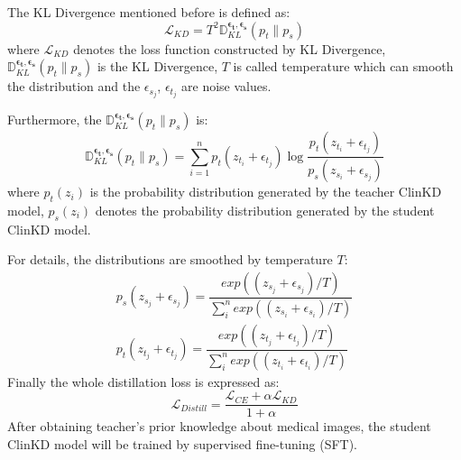The KL Divergence mentioned before is defined as:
\begin{equation}
    \mathcal{L}_{KD} = T^2\mathbb{D}^{\boldsymbol{\epsilon_{t}}, \boldsymbol{\epsilon_{s}}}_{KL}(p_{t} \|p_{s})
\end{equation}
where $\mathcal{L}_{KD}$ denotes the loss function constructed by KL Divergence, $\mathbb{D}^{\boldsymbol{\epsilon_{t}}, \boldsymbol{\epsilon_{s}}}_{KL}(p_{t} \|p_{s})$ is the KL Divergence, $T$ is called temperature which can smooth the distribution and the $\epsilon_{s_j}$, $\epsilon_{t_j}$ are noise values. 

Furthermore, the $\mathbb{D}^{\boldsymbol{\epsilon_{t}}, \boldsymbol{\epsilon_{s}}}_{KL}(p_{t} \|p_{s})$ is:
\begin{equation}
    \mathbb{D}^{\boldsymbol{\epsilon_{t}}, \boldsymbol{\epsilon_{s}}}_{KL}(p_{t} \|p_{s}) = \sum_{i=1}^np_t(z_{t_i}+\epsilon_{t_j})\log\frac{p_t(z_{t_i}+\epsilon_{t_j})}{p_s(z_{s_i}+\epsilon_{s_j})}
\end{equation}
where $p_t(z_i)$ is the probability distribution generated by the teacher ClinKD model, $p_s(z_i)$ denotes the probability distribution generated by the student ClinKD model. 

For details, the distributions are smoothed by temperature $T$:
\begin{equation}
    \begin{aligned}
        p_s(z_{s_j}+\epsilon_{s_j}) = \dfrac{exp((z_{s_j}+\epsilon_{s_j})/T)}{\displaystyle\sum_i^nexp((z_{s_i}+\epsilon_{s_i})/T)}\\
        p_t(z_{t_j}+\epsilon_{t_j}) = \dfrac{exp((z_{t_j}+\epsilon_{t_j})/T)}{\displaystyle\sum_i^nexp((z_{t_i}+\epsilon_{t_i})/T)}  
    \end{aligned}
\end{equation}
Finally the whole distillation loss is expressed as:
\begin{equation}
    \mathcal{L}_{Distill} = \dfrac{\mathcal{L}_{CE} + \alpha \mathcal{L}_{KD}}{1+\alpha}
    \label{distillation}
\end{equation}
After obtaining teacher's prior knowledge about medical images, the student ClinKD model will be trained by supervised fine-tuning (SFT). 

